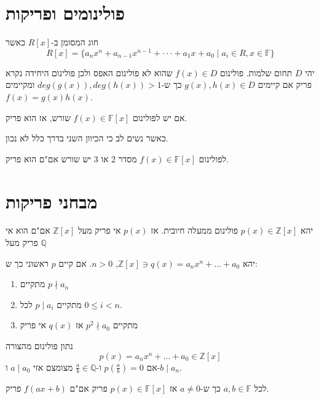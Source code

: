 \documentclass{tstextbook}
\begin{document}
\section{פולינומים ופריקות}

\begin{definition}
חוג המסומן ב-\(R[x]\) כאשר 
$$R[x]=\{a_{n}x^{n}+a_{n-1}x^{n-1}+\cdot\cdot\cdot+a_{1}x+a_{0}\mid a_{i}\in R, x \in \mathbb{F} \} $$

\end{definition}
\begin{definition}
יהי \(D\) תחום שלמות. פולינום \(f(x)\in D\) שהוא לא פולינום האפס ולכן פולינום היחידה נקרא פריק אם קיימים \(g(x),h(x)\in D\) כך ש-\(deg(g(x)),deg(h(x))>1\) ומקיימים \(f(x)=g(x)h(x)\).

\end{definition}
\begin{proposition}
אם יש לפולינום \(f(x)\in \mathbb{F}[x]\) שורש, אז הוא פריק. 

\end{proposition}
כאשר נשים לב כי הכיוון השני בדרך כלל לא נכון.

\begin{proposition}
לפולינום \(f(x)\in \mathbb{F}[x]\) מסדר 2 או 3 יש שורש אם"ם הוא פריק.

\end{proposition}
\section{מבחני פריקות}

\begin{proposition}
יהא \(p(x)\in \mathbb{Z}[x]\) פולינום ממעלה חיובית. אז \(p(x)\) אי פריק מעל \(\mathbb{Z}[x]\) אם"ם הוא אי פריק מעל \(\mathbb{Q}\)

\end{proposition}
\begin{proposition}
יהא \(\mathbb{Z}[x]\ni q(x)=a_{n}x^n+\dots+a_{0}\), \(n>0\).
אם קיים \(p\) ראשוני כך ש:

  \begin{enumerate}
    \item מתקיים \(p\nmid a_n\)


    \item מתקיים \(p\mid a_{i}\) לכל \(0\leq i<n\). 


    \item מתקיים \(p^2 \nmid a_{0}\) 
אז \(q(x)\) אי פריק


  \end{enumerate}
\end{proposition}
\begin{proposition}
נתון פולינום מהצורה $$p(x)=a_{n}x^{n}+\ldots+a_{0}\in\mathbb{Z}[x]$$ אם \(p\left( \frac{a}{b} \right)=0\) ו-\(\frac{a}{b}\in \mathbb{ Q}\) מצומצם אזי \(a\mid a_{0}\) ו-\(b\mid a_{n}\).

\end{proposition}
\begin{proposition}
לכל \(a,b \in \mathbb{F}\) כך ש-\(a\neq 0\) אז \(p(x) \in \mathbb{F} [x]\) פריק אם"ם \(f(ax+b)\) פריק.

\end{proposition}
\end{document}
